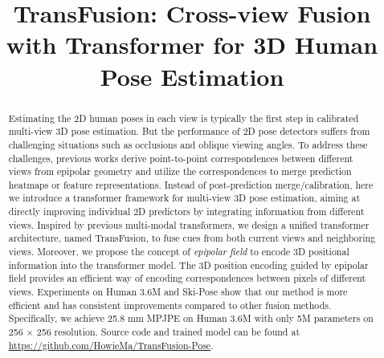 \documentclass{bmvc2k}
\title{TransFusion: Cross-view Fusion with Transformer for 3D Human Pose Estimation}
\begin{document}
\maketitle

\begin{abstract}
Estimating the 2D human poses in each view is typically the first step in calibrated multi-view 3D pose estimation. But the performance of 2D pose detectors suffers from challenging situations such as occlusions and oblique viewing angles. To address these challenges, previous works derive point-to-point correspondences between different views from epipolar geometry and utilize the correspondences to merge prediction heatmaps or feature representations. Instead of post-prediction merge/calibration, here we introduce a transformer framework for multi-view 3D pose estimation, aiming at directly improving individual 2D predictors by integrating information from different views. Inspired by previous multi-modal transformers, we design a unified transformer architecture, named TransFusion, to fuse cues from both current views and neighboring views. Moreover, we propose the concept of {\em epipolar field} to encode 3D positional information into the transformer model.  The 3D position encoding guided by epipolar field provides an efficient way of encoding correspondences between pixels of different views. Experiments on Human 3.6M and Ski-Pose show that our method is more efficient and has consistent improvements compared to other fusion methods. Specifically, we achieve 25.8 mm MPJPE on Human 3.6M with only 5M parameters on 256 $\times$ 256 resolution. 
Source code and trained model can be found at \href{https://github.com/HowieMa/TransFusion-Pose}{https://github.com/HowieMa/TransFusion-Pose}. 
\end{abstract}



\vspace{-1.0em}
\end{document}
